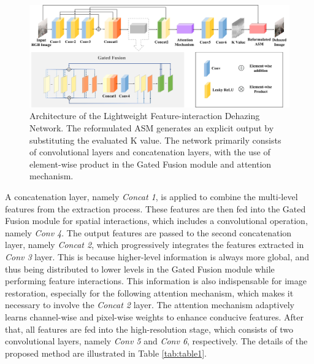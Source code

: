 \documentclass[lettersize,journal]{IEEEtran}
\begin{document}
\begin{figure}[t]
    \centering
    \includegraphics[width=\textwidth]{figure1_x.jpg}
    \caption{Architecture of the Lightweight Feature-interaction Dehazing Network. The reformulated ASM generates an explicit output by substituting the evaluated K value. The network primarily consists of convolutional layers and concatenation layers, with the use of element-wise product in the Gated Fusion module and attention mechanism.}
    \label{LFD-Net}
\end{figure}

A concatenation layer, namely \textit{Concat 1}, is applied to combine the multi-level features from the extraction process. These features are then fed into the Gated Fusion module for spatial interactions, which includes a convolutional operation, namely \textit{Conv 4}. The output features are passed to the second concatenation layer, namely \textit{Concat 2}, which progressively integrates the features extracted in \textit{Conv 3} layer. This is because higher-level information is always more global, and thus being distributed to lower levels in the Gated Fusion module while performing feature interactions. This information is also indispensable for image restoration, especially for the following attention mechanism, which makes it necessary to involve the \textit{Concat 2} layer. The attention mechanism adaptively learns channel-wise and pixel-wise weights to enhance conducive features. After that, all features are fed into the high-resolution stage, which consists of two convolutional layers, namely \textit{Conv 5} and \textit{Conv 6}, respectively. The details of the proposed method are illustrated in Table \ref{tab:table1}.
\end{document}
